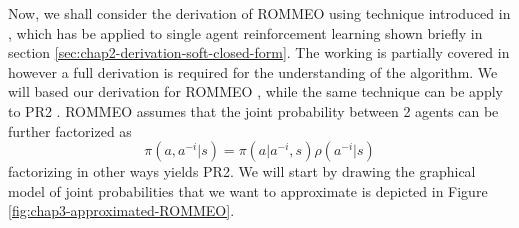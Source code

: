 Now, we shall consider the derivation of ROMMEO using technique introduced in \cite{levine2018reinforcement}, which has be applied to single agent reinforcement learning shown briefly in section \ref{sec:chap2-derivation-soft-closed-form}. The working is partially covered in \cite{yu2019multi, wen2019multi} however a full derivation is required for the understanding of the algorithm. We will based our derivation for ROMMEO \cite{tian2019regularized}, while the same technique can be apply to PR2 \cite{wen2019probabilistic}. ROMMEO assumes that the joint probability between 2 agents can be further factorized as
\begin{equation}
    \pi(a, a^{-i} | s) = \pi(a | a^{-i}, s) \rho(a^{-i} | s)
\end{equation}
factorizing in other ways yields PR2. We will start by drawing the graphical model of joint probabilities that we want to approximate is depicted in Figure \ref{fig:chap3-approximated-ROMMEO}. 
